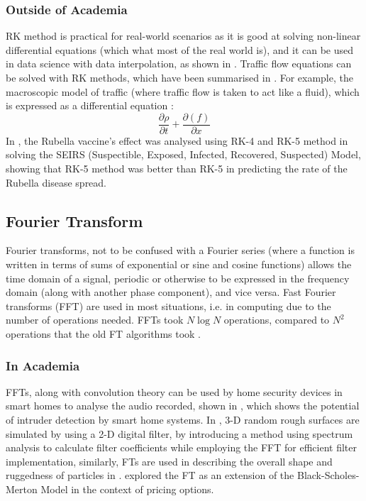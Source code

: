 \documentclass[a4paper, 10pt, conference]{ieeeconf}      %
\begin{document}
\subsubsection{Outside of Academia} %
RK method is practical for real-world scenarios as it is good at solving non-linear differential equations (which what most of the real world is), and it can be used in data science with data interpolation, as shown in \cite{Karim2018}. Traffic flow equations can be solved with RK methods, which have been summarised in \cite{Naja2022}. For example, the macroscopic model of traffic (where traffic flow is taken to act like a fluid), which is expressed as a differential equation \cite{Lighthill1955}\cite{Nagatani2002}: 
\begin{equation}
    \frac{\partial{\rho}}{\partial{t}} + \frac{\partial(f)}{\partial{x}}
\end{equation}
In \cite{Asri2021}, the Rubella vaccine's effect was analysed using RK-4 and RK-5 method in solving the SEIRS (Suspectible, Exposed, Infected, Recovered, Suspected) Model, showing that RK-5 method was better than RK-5 in predicting the rate of the Rubella disease spread. 
\\

\subsection{Fourier Transform} %
Fourier transforms, not to be confused with a Fourier series (where a function is written in terms of sums of exponential or sine and cosine functions) allows the time domain of a signal, periodic or otherwise to be expressed in the frequency domain (along with another phase component), and vice versa. Fast Fourier transforms (FFT) are used in most situations, i.e. in computing due to the number of operations needed. FFTs took $N\log{N}$ operations, compared to $N^2$ operations that the old FT algorithms took \cite{Cooley1969}.
\\
\subsubsection{In Academia} %
FFTs, along with convolution theory can be used by home security devices in smart homes to analyse the audio recorded, shown in \cite{Vadeiadis2020}, which shows the potential of intruder detection by smart home systems. In \cite{Hu1992}, 3-D random rough surfaces are simulated by using a 2-D digital filter, by introducing a method using spectrum analysis to calculate filter coefficients while employing the FFT for efficient filter implementation, similarly, FTs are used in describing the overall shape and ruggedness of particles in \cite{Wettimuny2004}. \cite{Orzechowski2019} explored the FT as an extension of the Black-Scholes-Merton Model in the context of pricing options.
\\
\end{document}
